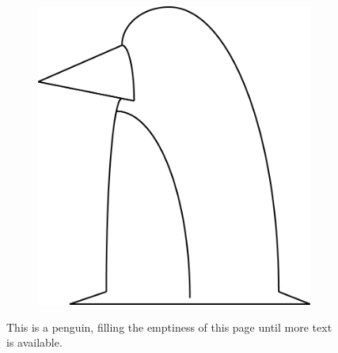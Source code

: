 \begin{figure}[h]
\centering
\begin{subfigure}[b]{0.8\textwidth}
                \includegraphics[width=\textwidth]{penguin}
\end{subfigure}
\caption{This is a penguin, filling the emptiness of this page until more text is available.}
\label{penguin}
\end{figure}


